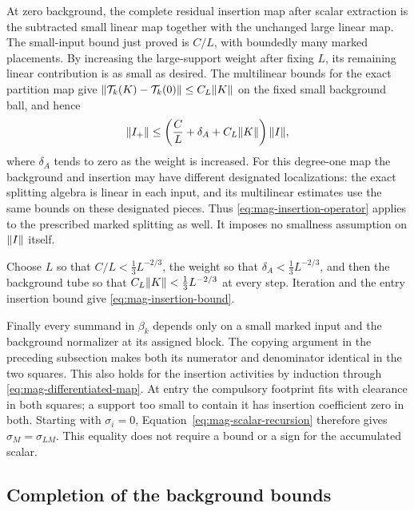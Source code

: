 At zero background, the complete residual insertion map after
scalar extraction is the subtracted small linear map together
with the unchanged large linear map.  The small-input bound just
proved is $C/L$, with boundedly many marked placements.  By
increasing the large-support weight after fixing $L$, its remaining
linear contribution is as small as desired.  The multilinear bounds
for the exact partition map give
$\lVert\mathcal T_k(K)-\mathcal T_k(0)\rVert\le C_L\lVert K\rVert$ on the
fixed small background ball, and hence
\begin{equation}\label{eq:mag-insertion-operator}
 \lVert I_+\rVert
 \le\left(\frac{C}{L}+\delta_A
                       +C_L\lVert K\rVert\right)\lVert I\rVert,
\end{equation}
where $\delta_A$ tends to zero as the weight is increased.
For this degree-one map the background and insertion may have
different designated localizations: the exact splitting algebra
is linear in each input, and its multilinear estimates use the
same bounds on these designated pieces.  Thus
\eqref{eq:mag-insertion-operator} applies to the prescribed marked
splitting as well.  It imposes no smallness assumption on
$\lVert I\rVert$ itself.

Choose $L$ so that $C/L<\tfrac13L^{-2/3}$, the weight so that
$\delta_A<\tfrac13L^{-2/3}$, and then the background tube so that
$C_L\lVert K\rVert<\tfrac13L^{-2/3}$ at every step.  Iteration and the
entry insertion bound give \eqref{eq:mag-insertion-bound}.

Finally every summand in $\beta_k$ depends only on a small marked
input and the background normalizer at its assigned block.
The copying argument in the preceding subsection makes both its
numerator and denominator identical in the two squares.  This
also holds for the insertion activities by induction through
\eqref{eq:mag-differentiated-map}.  At entry the compulsory footprint
fits with clearance in both squares; a support too small to
contain it has insertion coefficient zero in both.  Starting with
$\sigma_i=0$, Equation~\eqref{eq:mag-scalar-recursion} therefore
gives $\sigma_M=\sigma_{LM}$.  This equality does not require a
bound or a sign for the accumulated scalar.

\subsection{Completion of the background bounds}

